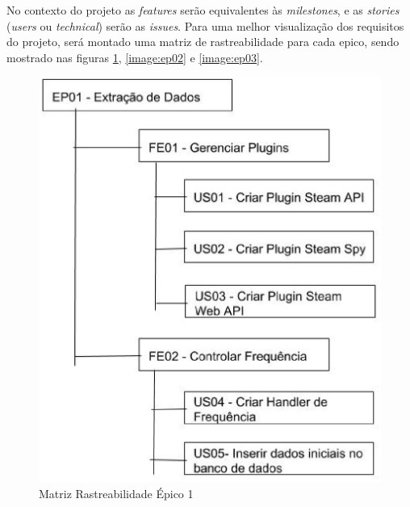 No contexto do projeto as \textit{features} serão equivalentes às \textit{milestones}, e as \textit{stories} (\textit{users} ou \textit{technical}) serão as \textit{issues}. Para uma melhor visualização dos requisitos do projeto, será montado uma matriz de rastreabilidade para cada epico, sendo mostrado nas figuras \ref{image:ep01}, \ref{image:ep02} e \ref{image:ep03}.
\begin{figure}
\centering
\includegraphics[scale=0.35]{figuras/EP01.eps}
\caption{Matriz Rastreabilidade Épico 1}
\label{image:ep01}
\end{figure}
